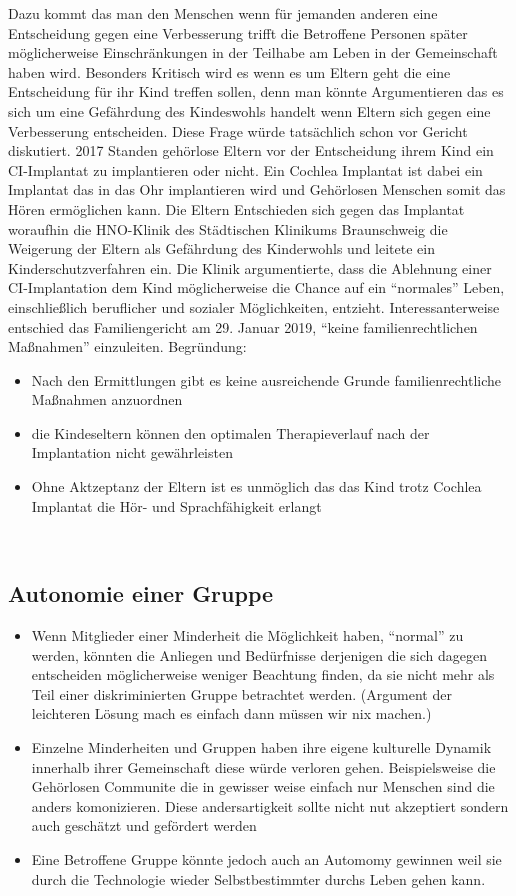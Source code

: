 \documentclass[a4paper,
DIV=13,
12pt,
BCOR=10mm,
department=FakEI,
twoside,
parskip=half,
automark,
]{OTHRartcl}
\begin{document}
Dazu kommt das man den Menschen wenn für jemanden anderen eine Entscheidung gegen eine Verbesserung trifft die Betroffene Personen später  möglicherweise Einschränkungen in der 
Teilhabe am Leben in der Gemeinschaft haben wird. Besonders Kritisch wird es wenn es um Eltern geht die eine Entscheidung für ihr Kind treffen sollen, denn man könnte Argumentieren 
das es sich um eine Gefährdung des Kindeswohls handelt wenn Eltern sich gegen eine Verbesserung entscheiden.
Diese Frage würde tatsächlich schon vor Gericht diskutiert. 2017 Standen gehörlose Eltern vor der Entscheidung ihrem Kind ein CI-Implantat zu implantieren oder nicht. Ein Cochlea 
Implantat ist dabei ein Implantat das in das Ohr implantieren wird und Gehörlosen Menschen somit das Hören ermöglichen kann. Die Eltern Entschieden sich gegen das Implantat
woraufhin die HNO-Klinik des Städtischen Klinikums Braunschweig die Weigerung der Eltern als Gefährdung des Kinderwohls und leitete ein Kinderschutzverfahren ein. 
Die Klinik argumentierte, dass die Ablehnung einer CI-Implantation dem Kind möglicherweise die Chance auf ein ``normales'' Leben, einschließlich beruflicher und 
sozialer Möglichkeiten, entzieht. Interessanterweise entschied das Familiengericht am 29. Januar 2019, ``keine familienrechtlichen Maßnahmen'' einzuleiten. 
Begründung:
\begin{itemize}
    \item Nach den Ermittlungen gibt es keine ausreichende Grunde familienrechtliche Maßnahmen anzuordnen
    \item die Kindeseltern können den optimalen Therapieverlauf nach der Implantation nicht gewährleisten
    \item Ohne Aktzeptanz der Eltern ist es unmöglich das das Kind trotz Cochlea Implantat die Hör- und Sprachfähigkeit erlangt
\end{itemize}
~\cite{brde}

\subsection*{Autonomie einer Gruppe}
\begin{itemize}
    \item Wenn Mitglieder einer Minderheit die Möglichkeit haben, ``normal'' zu werden, könnten die Anliegen und Bedürfnisse derjenigen die sich dagegen entscheiden möglicherweise 
    weniger Beachtung finden, da sie nicht mehr als Teil einer diskriminierten Gruppe betrachtet werden. (Argument der leichteren Lösung mach es einfach dann müssen wir nix machen.)
    \item Einzelne Minderheiten und Gruppen haben ihre  eigene kulturelle Dynamik innerhalb ihrer Gemeinschaft diese würde verloren gehen. Beispielsweise die Gehörlosen Communite 
    die in gewisser weise einfach nur Menschen sind die anders komonizieren. Diese andersartigkeit sollte nicht nut akzeptiert sondern auch geschätzt und gefördert werden~\cite{lee2016cochlear}
    \item Eine Betroffene Gruppe könnte jedoch auch an Automomy gewinnen weil sie durch die Technologie wieder Selbstbestimmter durchs Leben gehen kann.~\cite{das2022locked}
\end{itemize}
\end{document}
